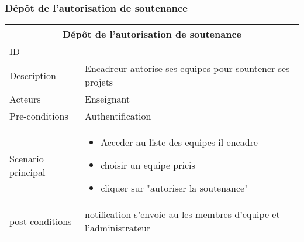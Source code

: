 \documentclass[11pt,fleqn]{book} %
\begin{document}
\subsubsection{Dépôt de l’autorisation de soutenance}
\begin{center}
\begin{tabularx}{1\textwidth} { | p{4cm} | >{\raggedright\arraybackslash}X |  }
  \hline
  \multicolumn{2}{|c|}{Dépôt de l’autorisation de soutenance} \\
 \hline
 ID & 2  \\
 \hline
 Description  & Encadreur autorise ses equipes pour sountener ses projets   \\
  \hline
 Acteurs  & Enseignant   \\
  \hline
 Pre-conditions  & Authentification\\
 \hline
 Scenario principal  &  
 \begin{itemize}
     \item  Acceder au liste des equipes il encadre
     \item choisir un equipe pricis
     \item cliquer sur "autoriser la soutenance"

 \end{itemize}\\
  \hline
 post conditions  & notification s'envoie au les membres d'equipe et l'administrateur \\
  \hline
\end{tabularx}
\label{tbl:nicetablelesstable}
\end{center}
\end{document}
